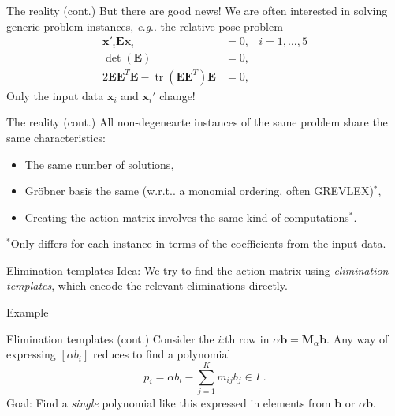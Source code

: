 \documentclass[aspectratio=169]{beamer}
\makeatletter
\newcommand{\mat}[1]{\bm{#1}}
\DeclareMathOperator{\tr}{tr}
\newcommand{\T}{T}
\DeclareRobustCommand\eg{\emph{e.g}\@ifnextchar.{}{.\@}}
\DeclareRobustCommand\wrt{w.r.t\@ifnextchar.{}{.\@}}
\makeatother
\begin{document}
\begin{frame}{The reality (cont.)}
But there are good news!
We are often interested in solving generic problem instances, \eg{} the relative pose
problem
\begin{equation*}
\begin{aligned}
    \mat{x}'_i\mat{E}\mat{x}_i &= 0, &i=1,\ldots,5\\
    \det(\mat{E}) &= 0, &\\
    2\mat{EE}^\T\mat{E}- \tr(\mat{EE}^\T)\mat{E} &= 0, &
\end{aligned}
\end{equation*}
Only the input data $\mat{x}_i$ and $\mat{x}_i'$ change!
\end{frame}

\begin{frame}{The reality (cont.)}
All non-degenearte instances of the same problem share the same characteristics:
\begin{itemize}
\item The same number of solutions,
\item Gröbner basis the same (\wrt{} a monomial ordering, often GREVLEX)${}^*$,
\item Creating the action matrix involves the same kind of computations${}^*$.
\end{itemize}
${}^*$Only differs for each instance in terms of the coefficients from the input data.
\end{frame}

\begin{frame}{Elimination templates}
\alert{Idea:} We try to find the action matrix using \emph{elimination templates},
which encode the relevant eliminations directly.
\end{frame}

\begin{frame}{Example}
\end{frame}

\begin{frame}{Elimination templates (cont.)}
Consider the $i$:th row in $\alpha\mat{b} = \mat{M}_\alpha\mat{b}$.
Any way of expressing $[\alpha b_i]$ reduces to find a polynomial
\begin{equation}\label{eq:polys}
    p_i = \alpha b_i -\sum_{j=1}^Km_{ij}b_{j}\in I\;.
\end{equation}
\alert{Goal:} Find a \emph{single} polynomial like this expressed in elements from
$\mat{b}$ or $\alpha\mat{b}$.
\end{frame}
\end{document}
